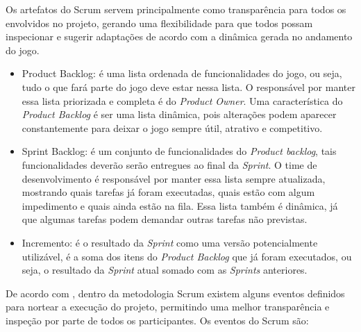 \documentclass[quali]{ppgccufscar}
\begin{document}
Os artefatos do Scrum servem principalmente como transparência para todos os envolvidos no projeto, gerando uma flexibilidade para que todos possam inspecionar e sugerir adaptações de acordo com a dinâmica gerada no andamento do jogo.

\begin{itemize}
	\item Product Backlog: é uma lista ordenada de funcionalidades do jogo, ou seja, tudo o que fará parte do jogo deve estar nessa lista. O responsável por manter essa lista priorizada e completa é do \textit{Product Owner}. Uma característica do \textit{Product Backlog} é ser uma lista dinâmica, pois alterações podem aparecer constantemente para deixar o jogo sempre útil, atrativo e competitivo.
	\item Sprint Backlog: é um conjunto de funcionalidades do \textit{Product backlog}, tais funcionalidades deverão serão entregues ao final da \textit{Sprint}. O time de desenvolvimento é responsável por manter essa lista sempre atualizada, mostrando quais tarefas já foram executadas, quais estão com algum impedimento e quais ainda estão na fila. Essa lista também é dinâmica, já que algumas tarefas podem demandar outras tarefas não previstas.
	\item Incremento: é o resultado da \textit{Sprint} como uma versão potencialmente utilizável, é a soma dos itens do \textit{Product Backlog} que já foram executados, ou seja, o resultado da \textit{Sprint} atual somado com as \textit{Sprints} anteriores.
\end{itemize}

De acordo com , dentro da metodologia Scrum existem alguns eventos definidos para nortear a execução do projeto, permitindo uma melhor transparência e inspeção por parte de todos os participantes. Os eventos do Scrum são:
\end{document}
